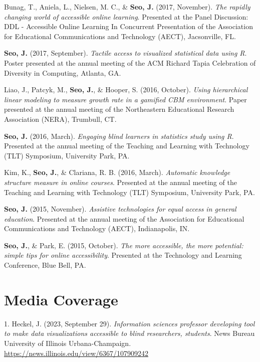 \documentclass[11pt,a4paper,]{awesome-cv}
\begin{document}
Bunag, T., Aniela, L., Nielsen, M. C., \& \textbf{Seo, J.} (2017,
November). \emph{The rapidly changing world of accessible online
  learning}. Presented at the Panel Discussion: DDL - Accessible Online
Learning In Concurrent Presentation of the Association for Educational
Communications and Technology (AECT), Jacsonville, FL.

\textbf{Seo, J.} (2017, September). \emph{Tactile access to visualized
  statistical data using R}. Poster presented at the annual meeting of the
ACM Richard Tapia Celebration of Diversity in Computing, Atlanta, GA.

Liao, J., Patcyk, M., \textbf{Seo, J.}, \& Hooper, S. (2016, October).
\emph{Using hierarchical linear modeling to measure growth rate in a
  gamified CBM environment}. Paper presented at the annual meeting of the
Northeastern Educational Research Association (NERA), Trumbull, CT.

\textbf{Seo, J.} (2016, March). \emph{Engaging blind learners in
  statistics study using R}. Presented at the annual meeting of the
Teaching and Learning with Technology (TLT) Symposium, University Park,
PA.

Kim, K., \textbf{Seo, J.}, \& Clariana, R. B. (2016, March).
\emph{Automatic knowledge structure measure in online courses}.
Presented at the annual meeting of the Teaching and Learning with
Technology (TLT) Symposium, University Park, PA.

\textbf{Seo, J.} (2015, November). \emph{Assistive technologies for
  equal access in general education}. Presented at the annual meeting of
the Association for Educational Communications and Technology (AECT),
Indianapolis, IN.

\textbf{Seo, J.}, \& Park, E. (2015, October). \emph{The more
  accessible, the more potential: simple tips for online accessibility}.
Presented at the Technology and Learning Conference, Blue Bell, PA.

\hypertarget{media-coverage}{%
  \section{Media Coverage}\label{media-coverage}}

\hypertarget{bibliography}{}
\leavevmode\hypertarget{ref-heckelInformationSciencesProfessora}{}%
1. Heckel, J. (2023, September 29). \emph{Information sciences professor
  developing tool to make data visualizations accessible to blind
  researchers, students}. News Bureau University of Illinois
Urbana-Champaign. \url{https://news.illinois.edu/view/6367/107909242}
\end{document}
